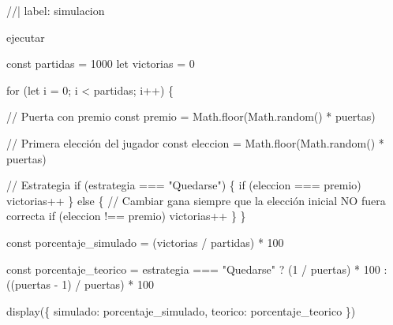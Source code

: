 \documentclass[
  spanish,
  letterpaper,
  DIV=11,
  numbers=noendperiod,
  oneside]{scrreprt}
\newenvironment{Shaded}{\begin{snugshade}}{\end{snugshade}}
\newcommand{\NormalTok}[1]{\textcolor[rgb]{0.00,0.23,0.31}{#1}}
\begin{document}
\begin{Shaded}
\begin{Highlighting}[]
\NormalTok{//| label: simulacion}

\NormalTok{ejecutar}

\NormalTok{const partidas = 1000}
\NormalTok{let victorias = 0}

\NormalTok{for (let i = 0; i \textless{} partidas; i++) \{}

\NormalTok{  // Puerta con premio}
\NormalTok{  const premio = Math.floor(Math.random() * puertas)}

\NormalTok{  // Primera elección del jugador}
\NormalTok{  const eleccion = Math.floor(Math.random() * puertas)}

\NormalTok{  // Estrategia}
\NormalTok{  if (estrategia === "Quedarse") \{}
\NormalTok{    if (eleccion === premio) victorias++}
\NormalTok{  \} else \{}
\NormalTok{    // Cambiar gana siempre que la elección inicial NO fuera correcta}
\NormalTok{    if (eleccion !== premio) victorias++}
\NormalTok{  \}}
\NormalTok{\}}

\NormalTok{const porcentaje\_simulado = (victorias / partidas) * 100}

\NormalTok{const porcentaje\_teorico =}
\NormalTok{  estrategia === "Quedarse"}
\NormalTok{    ? (1 / puertas) * 100}
\NormalTok{    : ((puertas {-} 1) / puertas) * 100}

\NormalTok{display(\{}
\NormalTok{  simulado: porcentaje\_simulado,}
\NormalTok{  teorico: porcentaje\_teorico}
\NormalTok{\})}
\end{Highlighting}
\end{Shaded}
\end{document}
